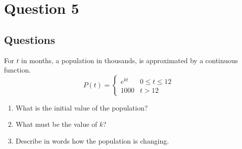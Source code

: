 \chapter{Question 5}
\section{Questions}
For $t$ in months, a population in thousands, is approximated by a continuous
function. \\
\[
P(t) =
\begin{cases}
  e^{kt} & 0 \leq t \leq 12 \\
  1000   & t > 12
\end{cases}
\]
\begin{enumerate}
  \item What is the initial value of the population?
  \item What must be the value of $k$?
  \item Describe in words how the population is changing.
\end{enumerate}

